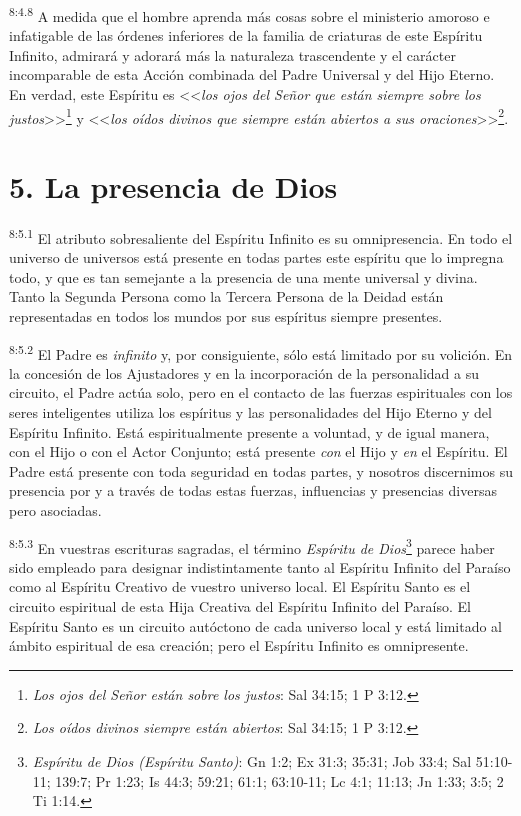 \par
\textsuperscript{8:4.8} A medida que el hombre aprenda más cosas sobre el ministerio amoroso e infatigable de las órdenes inferiores de la familia de criaturas de este Espíritu Infinito, admirará y adorará más la naturaleza trascendente y el carácter incomparable de esta Acción combinada del Padre Universal y del Hijo Eterno. En verdad, este Espíritu es <<\textit{los ojos del Señor que están siempre sobre los justos}>>\footnote{\textit{Los ojos del Señor están sobre los justos}: Sal 34:15; 1 P 3:12.} y <<\textit{los oídos divinos que siempre están abiertos a sus oraciones}>>\footnote{\textit{Los oídos divinos siempre están abiertos}: Sal 34:15; 1 P 3:12.}.

\section*{5. La presencia de Dios}
\par
\textsuperscript{8:5.1} El atributo sobresaliente del Espíritu Infinito es su omnipresencia. En todo el universo de universos está presente en todas partes este espíritu que lo impregna todo, y que es tan semejante a la presencia de una mente universal y divina. Tanto la Segunda Persona como la Tercera Persona de la Deidad están representadas en todos los mundos por sus espíritus siempre presentes.

\par
\textsuperscript{8:5.2} El Padre es \textit{infinito} y, por consiguiente, sólo está limitado por su volición. En la concesión de los Ajustadores y en la incorporación de la personalidad a su circuito, el Padre actúa solo, pero en el contacto de las fuerzas espirituales con los seres inteligentes utiliza los espíritus y las personalidades del Hijo Eterno y del Espíritu Infinito. Está espiritualmente presente a voluntad, y de igual manera, con el Hijo o con el Actor Conjunto; está presente \textit{con} el Hijo y \textit{en} el Espíritu. El Padre está presente con toda seguridad en todas partes, y nosotros discernimos su presencia por y a través de todas estas fuerzas, influencias y presencias diversas pero asociadas.

\par
\textsuperscript{8:5.3} En vuestras escrituras sagradas, el término \textit{Espíritu de Dios}\footnote{\textit{Espíritu de Dios (Espíritu Santo)}: Gn 1:2; Ex 31:3; 35:31; Job 33:4; Sal 51:10-11; 139:7; Pr 1:23; Is 44:3; 59:21; 61:1; 63:10-11; Lc 4:1; 11:13; Jn 1:33; 3:5; 2 Ti 1:14.} parece haber sido empleado para designar indistintamente tanto al Espíritu Infinito del Paraíso como al Espíritu Creativo de vuestro universo local. El Espíritu Santo es el circuito espiritual de esta Hija Creativa del Espíritu Infinito del Paraíso. El Espíritu Santo es un circuito autóctono de cada universo local y está limitado al ámbito espiritual de esa creación; pero el Espíritu Infinito es omnipresente.

